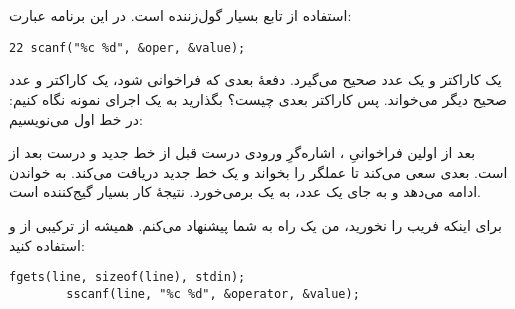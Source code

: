 \section{}
\paragraph{}\label{answer:28}
استفاده از تابع  بسیار گول‌زننده است. در این برنامه عبارت:
\begin{LTR}
    \begin{lstlisting}[style=C++Style]
        22 scanf("%c %d", &oper, &value);
    \end{lstlisting}
\end{LTR}

یک کاراکتر و یک عدد صحیح می‌گیرد. دفعهٔ بعدی که  فراخوانی شود، یک کاراکتر و عدد صحیح دیگر می‌خواند. پس کاراکتر بعدی چیست؟ بگذارید به یک اجرای نمونه نگاه کنیم:
در خط اول می‌نویسیم: 

بعد از اولین فراخوانیِ ، اشاره‌گرِ ورودی درست قبل از خط جدید و درست بعد از  است.  بعدی سعی می‌کند تا عملگر را بخواند و یک خط جدید دریافت می‌کند. به خواندن ادامه می‌دهد و به جای یک عدد، به یک \lr{\texttt{+}} برمی‌خورد. نتیجهٔ کار بسیار گیج‌کننده است.

برای اینکه فریب  را نخورید، من یک راه به شما پیشنهاد می‌کنم. همیشه از ترکیبی از  و  استفاده کنید:
\begin{LTR}
    \begin{lstlisting}[style=C++Style]
        fgets(line, sizeof(line), stdin);
        sscanf(line, "%c %d", &operator, &value);
    \end{lstlisting}
\end{LTR}
